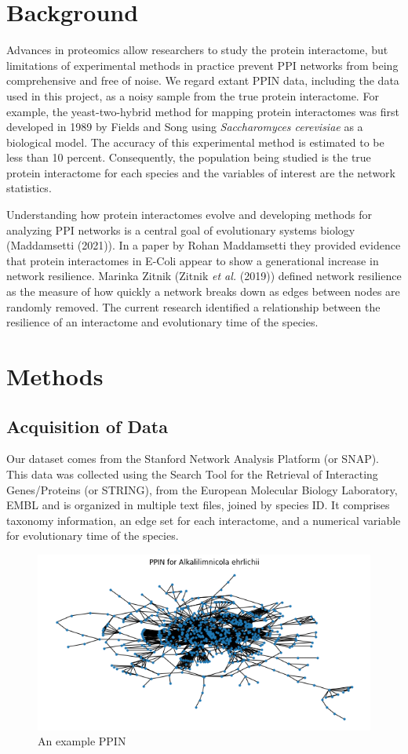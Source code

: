 \documentclass[12pt]{article}
\begin{document}
\section{Background}
Advances in proteomics allow researchers to study the protein interactome, but limitations of experimental methods in practice prevent PPI networks from being comprehensive and free of noise. We regard extant PPIN data, including the data used in this project, as a noisy sample from the true protein interactome. For example, the yeast-two-hybrid method for mapping protein interactomes was first developed in 1989 by Fields and Song using \textit{Saccharomyces cerevisiae} as a biological model. The accuracy of this experimental method is estimated to be less than 10 percent. Consequently, the population being studied is the true protein interactome for each species and the variables of interest are the network statistics.

Understanding how protein interactomes evolve and developing methods for analyzing PPI networks is a central goal of evolutionary systems biology (Maddamsetti (2021)). In a paper by Rohan Maddamsetti they provided evidence that protein interactomes in E-Coli appear to show a generational increase in network resilience. Marinka Zitnik (Zitnik \textit{et al.} (2019)) defined network resilience as the measure of how quickly a network breaks down as edges between nodes are randomly removed. The current research identified a relationship between the resilience of an interactome and evolutionary time of the species.


\section{Methods}
\subsection{Acquisition of Data}
Our dataset comes from the Stanford Network Analysis Platform (or SNAP). This data was collected using the Search Tool for the Retrieval of Interacting Genes/Proteins (or STRING), from the European Molecular Biology Laboratory, EMBL and is organized in multiple text files, joined by species ID. It comprises taxonomy information, an edge set for each interactome, and a numerical variable for evolutionary time of the species.

\begin{figure}
  \includegraphics[width=.9\linewidth]{PPIN_fig1}
  \caption{An example PPIN}
  \label{fig:PPIN_fig1}
\end{figure}
\end{document}
